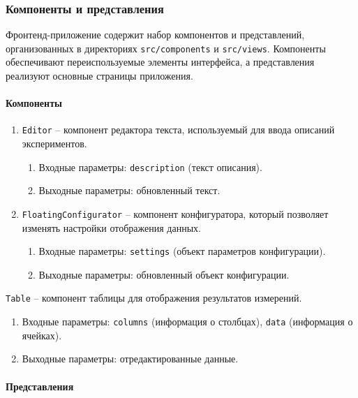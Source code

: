 \subsubsection{Компоненты и представления}

Фронтенд-приложение содержит набор компонентов и представлений, организованных в директориях \texttt{src/components} и \texttt{src/views}. Компоненты обеспечивают переиспользуемые элементы интерфейса, а представления реализуют основные страницы приложения.

\paragraph{Компоненты}

\begin{enumerate}
    \item \texttt{Editor} -- компонент редактора текста, используемый для ввода описаний экспериментов.
    \begin{enumerate}[label=\arabic{enumi}.\arabic*.]
        \item Входные параметры: \texttt{description} (текст описания).
        \item Выходные параметры: обновленный текст.
    \end{enumerate}

    \item \texttt{FloatingConfigurator} -- компонент конфигуратора, который позволяет изменять настройки отображения данных.
    \begin{enumerate}[label=\arabic{enumi}.\arabic*.]
        \item Входные параметры: \texttt{settings} (объект параметров конфигурации).
        \item Выходные параметры: обновленный объект конфигурации.
    \end{enumerate}
\end{enumerate}
\item \texttt{Table} -- компонент таблицы для отображения результатов измерений.
\begin{enumerate}[label=\arabic{enumi}.\arabic*.]
    \item Входные параметры: \texttt{columns} (информация о столбцах), \texttt{data} (информация о ячейках).
    \item Выходные параметры: отредактированные данные.
\end{enumerate}

\paragraph{Представления}

